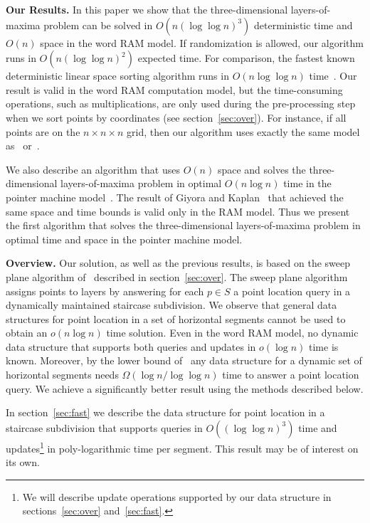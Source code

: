 \documentclass[10pt]{llncs}
\begin{document}
{\bf Our Results.}
In this paper we show that the three-dimensional layers-of-maxima problem 
can be solved in $O(n (\log \log n)^3)$ deterministic 
time and $O(n)$ space in the word RAM 
model. If randomization is allowed, our algorithm runs in 
$O(n(\log\log n)^2)$ expected time. 
For comparison, the fastest 
known deterministic linear space sorting algorithm runs 
in $O(n\log \log n)$ time~\cite{H04}. 
Our result is valid in the word 
RAM computation model, but the time-consuming operations, such as 
multiplications,  are only used during the pre-processing step when we sort 
points by coordinates (see section~\ref{sec:over}). For instance, 
if all points are on the $n\times n\times n$ grid, then our algorithm 
uses exactly the same model as~\cite{O88} or~\cite{BKS95}. 


We also describe an algorithm 
that uses $O(n)$ space and solves the three-dimensional layers-of-maxima 
problem in optimal $O(n\log n)$ time in the pointer machine model~\cite{T79}. 
The result of Giyora and Kaplan~\cite{GK09} that achieved the 
same space and time bounds is valid only in the RAM model. 
Thus we present  the first algorithm that solves the three-dimensional
 layers-of-maxima problem in optimal time and space in the pointer 
machine model. 

{\bf Overview.}
Our solution, as well as the previous results,  is based on the sweep
 plane algorithm of~\cite{BG04} described 
in section~\ref{sec:over}. The sweep plane algorithm assigns points 
to layers by answering for each  $p\in S$ a point location query in a 
dynamically maintained staircase subdivision. 
We observe that general data structures for point location in a  
set of horizontal segments cannot be used to obtain an $o(n\log n)$ time
 solution. Even in the word RAM model, no dynamic data structure that
 supports both queries and updates in $o(\log n)$ time is known. 
Moreover, by the lower bound 
of~\cite{AHR98} any data structure for a dynamic set of horizontal segments 
needs $\Omega(\log n/\log \log n)$ time to answer a point location 
query. We achieve a significantly better result using the methods 
described below.

In section~\ref{sec:fast} we describe the data structure for point location 
in a staircase subdivision that supports queries in 
$O((\log \log n)^3)$ time and updates\footnote{
We will describe update operations supported by our data structure in 
sections~\ref{sec:over} and~\ref{sec:fast}.} 
in poly-logarithmic time per segment. This result may be of interest on its 
own.
\end{document}
